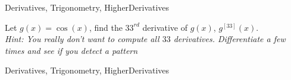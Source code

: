 
\begin{tagblock}{Derivatives, Trigonometry, HigherDerivatives}
\begin{question}
	






Let $g(x) = \cos(x)$, find the $33^{rd}$ derivative of $g(x)$, $g^{[33]}(x)$.   \\ \emph{Hint: You really don't want to compute all $33$ derivatives.  Differentiate a few times and see if you detect a pattern}



	
\begin{tags}
	    Derivatives, Trigonometry, HigherDerivatives
\end{tags}
	
\begin{diary}
\end{diary}
	
\begin{solution}
	   
\end{solution}
	
\end{question}

\end{tagblock}

